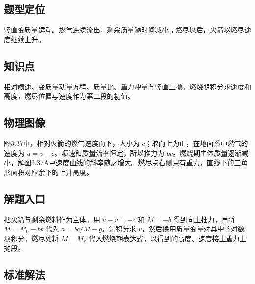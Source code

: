 \documentclass[UTF8,fontset=fandol,a4paper,11pt]{ctexart}
\begin{document}


\subsection*{题型定位}

竖直变质量运动。燃气连续流出，剩余质量随时间减小；燃尽以后，火箭以燃尽速度继续上升。



\subsection*{知识点}

相对喷速、变质量动量方程、质量比、重力冲量与竖直上抛。燃烧期积分求速度和高度，燃尽位置与速度作为第二段的初值。




\subsection*{物理图像}

图3.37中，相对火箭的燃气速度向下，大小为 $c$；取向上为正，在地面系中燃气的速度为 $u=v-c$。喷速和质量流率恒定，所以推力为 $bc$。燃烧期主体质量逐渐减小，解图3.37A中速度曲线的斜率随之增大。燃尽点右侧只有重力，直线下的三角形面积对应余下的上升高度。



\subsection*{解题入口}

把火箭与剩余燃料作为主体。用 $u-v=-c$ 和 $\dot M=-b$ 得到向上推力，再将 $M=M_0-bt$ 代入 $a=bc/M-g$。先积分求 $v$，然后换用质量变量对其中的对数项积分。燃尽处将 $M=M_s$ 代入燃烧期表达式，以得到的高度、速度接上重力上抛段。



\subsection*{标准解法}
\end{document}
